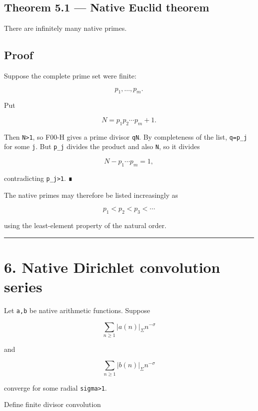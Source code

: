 \hypertarget{theorem-5.1-native-euclid-theorem}{%
\subsection{Theorem 5.1 --- Native Euclid theorem}\label{theorem-5.1-native-euclid-theorem}}

There are infinitely many native primes.

\hypertarget{proof-8}{%
\subsection{Proof}\label{proof-8}}

Suppose the complete prime set were finite:

\[
p_1,\ldots,p_m.
\]

Put

\[
N=p_1p_2\cdots p_m+1.
\]

Then \texttt{N\textgreater{}1}, so F00-H gives a prime divisor \texttt{q\textbar{}N}. By completeness of the list,
\texttt{q=p\_j} for some \texttt{j}. But \texttt{p\_j} divides the product and also \texttt{N}, so it divides

\[
N-p_1\cdots p_m=1,
\]

contradicting \texttt{p\_j\textgreater{}1}. ∎

The native primes may therefore be listed increasingly as

\[
p_1<p_2<p_3<\cdots
\]

using the least-element property of the natural order.

\begin{center}\rule{0.5\linewidth}{0.5pt}\end{center}

\hypertarget{native-dirichlet-convolution-series}{%
\section{6. Native Dirichlet convolution series}\label{native-dirichlet-convolution-series}}

Let \texttt{a,b} be native arithmetic functions. Suppose

\[
\sum_{n\ge1}|a(n)|_\Sigma n^{-\sigma}
\]

and

\[
\sum_{n\ge1}|b(n)|_\Sigma n^{-\sigma}
\]

converge for some radial \texttt{sigma\textgreater{}1}.

Define finite divisor convolution

